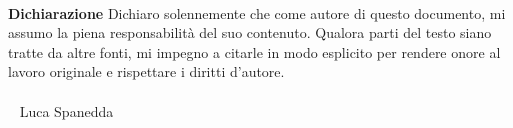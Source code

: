 \documentclass[12pt]{article}
\begin{document}


\newpage
\
\newpage

\vfill
\LARGE \textbf{Dichiarazione} \normalsize \newline \newline
Dichiaro solennemente che come autore di questo documento, 
mi assumo la piena responsabilità del suo contenuto. 
Qualora parti del testo siano tratte da altre fonti, 
mi impegno a citarle in modo esplicito per rendere onore 
al lavoro originale e rispettare i diritti d'autore. \\  \\
\
\hspace*{\fill} \large Luca Spanedda \normalsize
\
\newpage


\newpage
\
\newpage


\newpage
\
\newpage


\begingroup
\tableofcontents
\clearpage
\listoffigures
\lstlistoflistings
\endgroup
\newpage

\pagestyle{fancy}


\clearpage

\clearpage

\clearpage

\clearpage 
\newpage
\
\newpage
\appendix

\clearpage
\printbibliography
\end{document}

